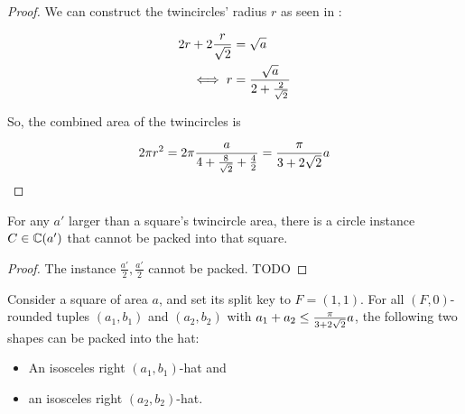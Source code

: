 \documentclass[a4paper,style=print,bibliography=totoc,nexus,lnum,extramargin]{tubsbook}
\begin{document}
\begin{proof}
    We can construct the twincircles' radius $r$ as seen in :

    \begin{align*}
        2r + 2\frac{r}{\sqrt{2}} &= \sqrt{a}\\
        \iff r &= \frac{\sqrt{a}}{2 + \frac{2}{\sqrt{2}}}\\
    \end{align*}

    So, the combined area of the twincircles is

    $$2\pi r^2 = 2\pi\frac{a}{4 + \frac{8}{\sqrt{2}}+\frac{4}{2}} = \frac{\pi}{3+2\sqrt{2}}a$$
\end{proof}


\begin{lemma}
    For any $a'$ larger than a square's twincircle area, there is a circle instance $C \in \mathbb{C}(a')$ that cannot be packed into that square.
\end{lemma}

\begin{proof}
    The instance ${\frac{a'}{2}, \frac{a'}{2}}$ cannot be packed. TODO
\end{proof}

\begin{lemma}\label{th:hats-in-square}
    Consider a square of area $a$, and set its split key to $F = (1,1)$.
    For all $(F,0)$-rounded tuples $(a_1, b_1)$ and $(a_2, b_2)$ with $a_1 + a_2 \le \frac{\pi}{3+2\sqrt{2}}a$, the following two shapes can be packed into the hat:
    \begin{itemize}
        \item An isosceles right $(a_1,b_1)$-hat and
        \item an isosceles right $(a_2,b_2)$-hat.
    \end{itemize}
\end{lemma}
\end{document}
